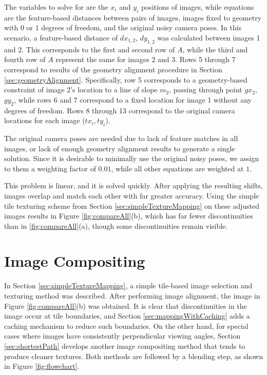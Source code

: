 \documentclass{llncs}
\begin{document}
The variables to solve for are the $x_i$ and $y_i$ positions of
images, while equations are the feature-based distances between pairs
of images, images fixed to geometry with 0 or 1 degrees of freedom,
and the original noisy camera poses. In this scenario, a feature-based
distance of $dx_{1,2}$, $dy_{1,2}$ was calculated between images 1 and
2. This corresponds to the first and second row of $A$, while the
third and fourth row of $A$ represent the same for images 2 and
3. Rows 5 through 7 correspond to results of the geometry alignment
procedure in Section \ref{sec:geometryAlignment}. Specifically, row 5
corresponds to a geometry-based constraint of image 2's location to a
line of slope $m_2$, passing through point $gx_2$, $gy_2$, while rows
6 and 7 correspond to a fixed location for image 1 without any degrees
of freedom. Rows 8 through 13 correspond to the original camera
locations for each image ($tx_i,ty_i$).

The original camera poses are needed due to lack of feature matches in
all images, or lack of enough geometry alignment results to generate a
single solution. Since it is desirable to minimally use the original
noisy poses, we assign to them a weighting factor of $0.01$, while all
other equations are weighted at $1$.


This problem is linear, and it is solved quickly. After applying the
resulting shifts, images overlap and match each other with far greater
accuracy. Using the simple tile texturing scheme from Section
\ref{sec:simpleTextureMapping} on these adjusted images results in
Figure \ref{fig:compareAll}(b), which has far fewer discontinuities
than in \ref{fig:compareAll}(a), though some discontinuities remain
visible.

\section{Image Compositing}
\label{sec:imageCompositing}
In Section \ref{sec:simpleTextureMapping}, a simple tile-based image
selection and texturing method was described. After performing image
alignment, the image in Figure \ref{fig:compareAll}(b) was
obtained. It is clear that discontinuities in the image occur at tile
boundaries, and Section \ref{sec:mappingWithCaching} adds a caching
mechanism to reduce such boundaries. On the other hand, for special
cases where images have consistently perpendicular viewing
angles, Section \ref{sec:shortestPath} develops another image
compositing method that tends to produce cleaner textures. Both
methods are followed by a blending step, as shown in Figure
\ref{fig:flowchart}.
\end{document}
